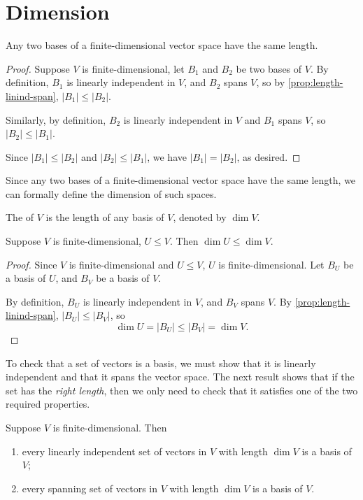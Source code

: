 \section{Dimension}
\begin{lemma}
Any two bases of a finite-dimensional vector space have the same length.
\end{lemma}

\begin{proof}
Suppose $V$ is finite-dimensional, let $B_1$ and $B_2$ be two bases of $V$. By definition, $B_1$ is linearly independent in $V$, and $B_2$ spans $V$, so by \ref{prop:length-linind-span}, $|B_1|\le|B_2|$.

Similarly, by definition, $B_2$ is linearly independent in $V$ and $B_1$ spans $V$, so $|B_2|\le|B_1|$.

Since $|B_1|\le|B_2|$ and $|B_2|\le|B_1|$, we have $|B_1|=|B_2|$, as desired.
\end{proof}

Since any two bases of a finite-dimensional vector space have the same length, we can formally define the dimension of such spaces.

\begin{definition}[Dimension]
The  of $V$ is the length of any basis of $V$, denoted by $\dim V$.
\end{definition}

\begin{lemma}\label{lemma:dim-subspace}
Suppose $V$ is finite-dimensional, $U\le V$. Then $\dim U\le\dim V$.
\end{lemma}

\begin{proof}
Since $V$ is finite-dimensional and $U\le V$, $U$ is finite-dimensional. Let $B_U$ be a basis of $U$, and $B_V$ be a basis of $V$.

By definition, $B_U$ is linearly independent in $V$, and $B_V$ spans $V$. By \ref{prop:length-linind-span}, $|B_U|\le|B_V|$, so
\[\dim U=|B_U|\le|B_V|=\dim V.\]
\end{proof}

To check that a set of vectors is a basis, we must show that it is linearly independent and that it spans the vector space. The next result shows that if the set has the \emph{right length}, then we only need to check that it satisfies one of the two required properties.

\begin{proposition}\label{prop:basis-length-dim}
Suppose $V$ is finite-dimensional. Then
\begin{enumerate}[label=(\roman*)]
\item every linearly independent set of vectors in $V$ with length $\dim V$ is a basis of $V$;
\item every spanning set of vectors in $V$ with length $\dim V$ is a basis of $V$.
\end{enumerate}
\end{proposition}


